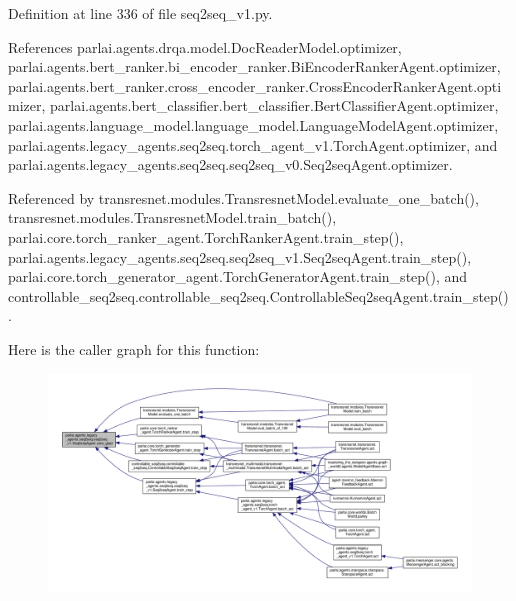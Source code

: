 Definition at line 336 of file seq2seq\+\_\+v1.\+py.



References parlai.\+agents.\+drqa.\+model.\+Doc\+Reader\+Model.\+optimizer, parlai.\+agents.\+bert\+\_\+ranker.\+bi\+\_\+encoder\+\_\+ranker.\+Bi\+Encoder\+Ranker\+Agent.\+optimizer, parlai.\+agents.\+bert\+\_\+ranker.\+cross\+\_\+encoder\+\_\+ranker.\+Cross\+Encoder\+Ranker\+Agent.\+optimizer, parlai.\+agents.\+bert\+\_\+classifier.\+bert\+\_\+classifier.\+Bert\+Classifier\+Agent.\+optimizer, parlai.\+agents.\+language\+\_\+model.\+language\+\_\+model.\+Language\+Model\+Agent.\+optimizer, parlai.\+agents.\+legacy\+\_\+agents.\+seq2seq.\+torch\+\_\+agent\+\_\+v1.\+Torch\+Agent.\+optimizer, and parlai.\+agents.\+legacy\+\_\+agents.\+seq2seq.\+seq2seq\+\_\+v0.\+Seq2seq\+Agent.\+optimizer.



Referenced by transresnet.\+modules.\+Transresnet\+Model.\+evaluate\+\_\+one\+\_\+batch(), transresnet.\+modules.\+Transresnet\+Model.\+train\+\_\+batch(), parlai.\+core.\+torch\+\_\+ranker\+\_\+agent.\+Torch\+Ranker\+Agent.\+train\+\_\+step(), parlai.\+agents.\+legacy\+\_\+agents.\+seq2seq.\+seq2seq\+\_\+v1.\+Seq2seq\+Agent.\+train\+\_\+step(), parlai.\+core.\+torch\+\_\+generator\+\_\+agent.\+Torch\+Generator\+Agent.\+train\+\_\+step(), and controllable\+\_\+seq2seq.\+controllable\+\_\+seq2seq.\+Controllable\+Seq2seq\+Agent.\+train\+\_\+step().

Here is the caller graph for this function\+:
\nopagebreak
\begin{figure}[H]
\begin{center}
\leavevmode
\includegraphics[width=350pt]{classparlai_1_1agents_1_1legacy__agents_1_1seq2seq_1_1seq2seq__v1_1_1Seq2seqAgent_af2e9c4d06f55802308dbfedfea69d0cd_icgraph}
\end{center}
\end{figure}


